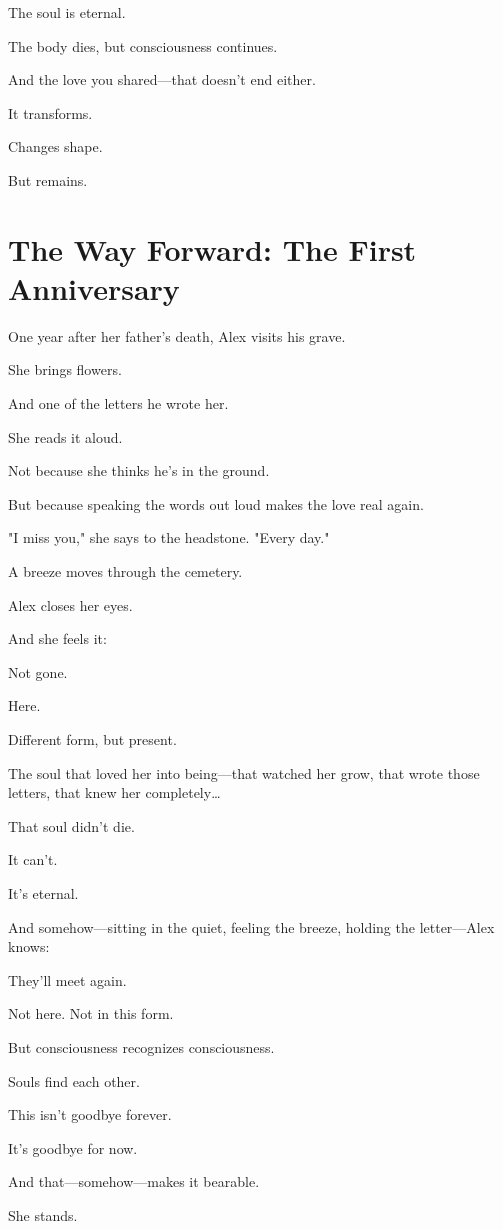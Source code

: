 \documentclass[11pt,twoside]{book}
\begin{document}
The soul is eternal.

The body dies, but consciousness continues.

And the love you shared—that doesn't end either.

It transforms.

Changes shape.

But remains.

\section*{The Way Forward: The First Anniversary}

One year after her father's death, Alex visits his grave.

She brings flowers.

And one of the letters he wrote her.

She reads it aloud.

Not because she thinks he's in the ground.

But because speaking the words out loud makes the love real again.

"I miss you," she says to the headstone. "Every day."

A breeze moves through the cemetery.

Alex closes her eyes.

And she feels it:

Not gone.

Here.

Different form, but present.

The soul that loved her into being—that watched her grow, that wrote those letters, that knew her completely\ldots{}

That soul didn't die.

It can't.

It's eternal.

And somehow—sitting in the quiet, feeling the breeze, holding the letter—Alex knows:

They'll meet again.

Not here. Not in this form.

But consciousness recognizes consciousness.

Souls find each other.

This isn't goodbye forever.

It's goodbye for now.

And that—somehow—makes it bearable.

She stands.
\end{document}
